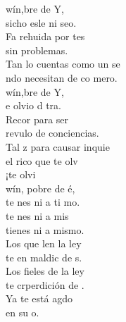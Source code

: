 \documentclass[12pt]{article}
\begin{document}
\begin{multicols*}{2}
\begin{cancion}%
	wín,bre de Y,  \\
	sicho esle ni seo.\\
	Fa rehuida por tes \\
sin problemas.\\
	Tan lo cuentas como un se \\
	ndo necesitan de co mero.\\
	wín,bre de Y,  \\
	e olvio d tra.\\
	Recor para ser\\
	revulo de conciencias.\\
	Tal z para causar inquie\\
	el rico que te olv  \\
	¡te olvi \\
	wín, pobre de é, \\
	 te nes ni a ti mo.\\
	te nes ni a  mis \\
	tienes ni a mismo.\\
	Los que len la ley \\
	te en maldic de s.\\
Los fieles de la ley \\
	te crperdición de .\\
	Ya te está agdo\\
	en su o.\\
\end{cancion}%


\end{multicols*}
\end{document}
